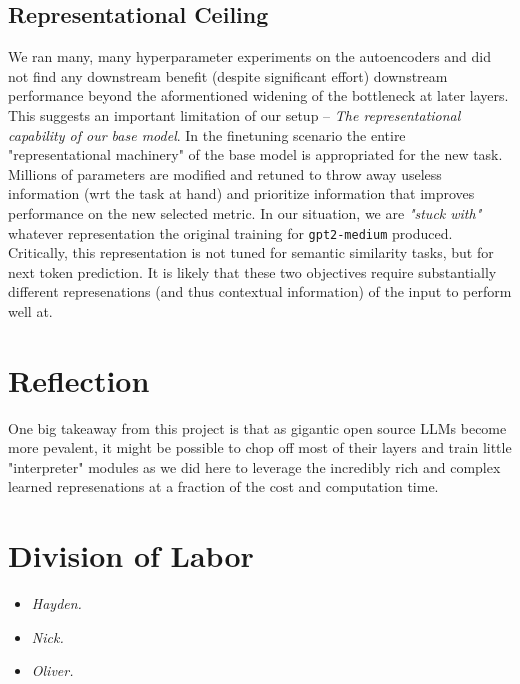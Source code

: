 \documentclass[14pt]{article}
\begin{document}
\subsection{Representational Ceiling}
We ran many, many hyperparameter experiments on the autoencoders and did not find any downstream benefit (despite significant effort) downstream performance beyond the aformentioned widening of the bottleneck at later layers. This suggests an important limitation of our setup -- \textit{The representational capability of our base model}. In the finetuning scenario the entire "representational machinery" of the base model is appropriated for the new task. Millions of parameters are modified and retuned to throw away useless information (wrt the task at hand) and prioritize information that improves performance on the new selected metric. In our situation, we are \textit{"stuck with"} whatever representation the original training for \verb|gpt2-medium| produced. Critically, this representation is not tuned for semantic similarity tasks, but for next token prediction. It is likely that these two objectives require substantially different represenations (and thus contextual information) of the input to perform well at.

\section{Reflection}

One big takeaway from this project is that as gigantic open source LLMs become more pevalent, it might be possible to chop off most of their layers and train little "interpreter" modules as we did here to leverage the incredibly rich and complex learned represenations at a fraction of the cost and computation time.

\section{Division of Labor}
\begin{itemize}
    \item \textit{Hayden.}
    \item \textit{Nick.} 
    \item \textit{Oliver.} 
\end{itemize}
\end{document}
